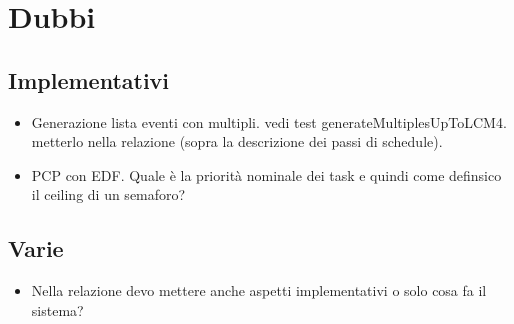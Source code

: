 \chapter{Dubbi}

\section{Implementativi}
\begin{itemize}
    \item Generazione lista eventi con multipli. vedi test generateMultiplesUpToLCM4. metterlo nella relazione (sopra la descrizione dei passi di schedule).
    \item PCP con EDF. Quale è la priorità nominale dei task e quindi come definsico il ceiling di un semaforo?
\end{itemize}

\section{Varie}
\begin{itemize}
    \item Nella relazione devo mettere anche aspetti implementativi o solo cosa fa il sistema?
\end{itemize}